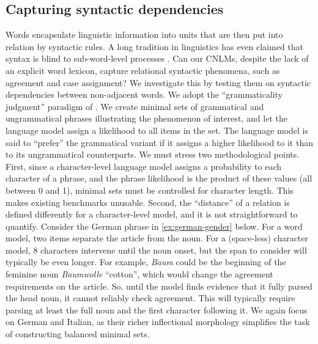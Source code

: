 \subsection{Capturing syntactic dependencies}
\label{sec:dependencies}

Words encapsulate linguistic information into units that are then put
into relation by syntactic rules. A long tradition in linguistics has
even claimed that syntax is blind to sub-word-level processes
\cite[e.g.,][]{Chomsky:1970,DiSciullo:Williams:1987,Bresnan:Mchombo:1995,Williams:2007}. Can
our CNLMs, despite the lack of an explicit word lexicon, capture
relational syntactic phenomena, such as agreement and case assignment?
We investigate this by testing them on syntactic dependencies between
non-adjacent words. We adopt the ``grammaticality judgment'' paradigm
of . We create minimal sets of grammatical
and ungrammatical phrases illustrating the phenomenon of interest, and
let the language model assign a likelihood to all items in the
set. The language model is said to ``prefer'' the grammatical variant
if it assigns a higher likelihood to it than to its ungrammatical
counterparts. We must stress two methodological points. First, since a
character-level language model assigns a probability to each character
of a phrase, and the phrase likelihood is the product of these values
(all between 0 and 1), minimal sets must be controlled for character
length. This makes existing benchmarks unusable. Second, the
``distance'' of a relation is defined differently for a
character-level model, and it is not straightforward to
quantify. Consider the German phrase in \ref{ex:german-gender}
below. For a word model, two items separate the article from the
noun. For a (space-less) character model, 8 characters intervene until
the noun onset, but the span to consider will typically be even longer. For
example, \emph{Baum} could be the beginning of the feminine noun
\emph{Baumwolle} ``cotton'', which would change the agreement
requirements on the article. So, until the model finds evidence that
it fully parsed the head noun, it cannot reliably check
agreement. This will typically require parsing at least the full noun
and the first character following it. We again focus on German and Italian, as their richer inflectional
morphology simplifies the task of constructing balanced minimal sets.




